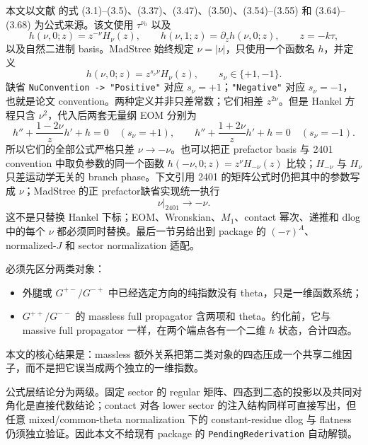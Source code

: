 \documentclass[11pt,a4paper]{ctexart}
\begin{document}
本文以文献 \cite{Chen:2023eic} 的式 (3.1)--(3.5)、(3.37)、(3.47)、(3.50)、(3.54)--(3.55) 和 (3.64)--(3.68) 为公式来源。该文使用 $\tau^{\nu_0}$ 以及
\begin{equation}
 h(\nu,0;z)=z^{-\nu}H_{\nu}(z),
 \qquad
 h(\nu,1;z)=\partial_z h(\nu,0;z),
 \qquad z=-k\tau,
 \label{eq:paper-h-definition}
\end{equation}
以及自然二进制 basis。MadStree 始终规定 $\nu=|\nu|$，只使用一个函数名 $h$，并定义
\begin{equation}
 \boxed{h(\nu,0;z)=z^{s_\nu\nu}H_\nu(z)},
 \qquad s_\nu\in\{+1,-1\}.
 \label{eq:positive-order-h}
\end{equation}
缺省 \texttt{NuConvention -> "Positive"} 对应 $s_\nu=+1$；\texttt{"Negative"} 对应 $s_\nu=-1$，也就是论文 convention。两种定义并非只差常数；它们相差 $z^{2\nu}$。但是 Hankel 方程只含 $\nu^2$，代入后两套无量纲 EOM 分别为
\begin{equation}
 h''+\frac{1-2\nu}{z}h'+h=0\quad(s_\nu=+1),
 \qquad
 h''+\frac{1+2\nu}{z}h'+h=0\quad(s_\nu=-1).
\end{equation}
所以它们的全部公式严格只差 $\nu\to-\nu$。也可以把正 prefactor basis 与 2401 convention 中取负参数的同一个函数 $h(-\nu,0;z)=z^\nu H_{-\nu}(z)$ 比较；$H_{-\nu}$ 与 $H_\nu$ 只差运动学无关的 branch phase。下文引用 2401 的矩阵公式时仍把其中的参数写成 $\nu$；MadStree 的正 prefactor缺省实现统一执行
\begin{equation}
 \boxed{\left.\nu\right|_{2401}\longrightarrow-\nu}.
 \label{eq:paper-to-positive-order}
\end{equation}
这不是只替换 Hankel 下标；EOM、Wronskian、$M_1$、contact 幂次、递推和 dlog 中的每个 $\nu$ 都必须同时替换。最后一节另给出到 package 的 $(-\tau)^A$、normalized-$J$ 和 sector normalization 适配。

必须先区分两类对象：
\begin{itemize}
  \item 外腿或 $G^{+-}/G^{-+}$ 中已经选定方向的纯指数没有 theta，只是一维函数系统；
  \item $G^{++}/G^{--}$ 的 massless full propagator 含两项和 theta。约化前，它与 massive full propagator 一样，在两个端点各有一个二维 $h$ 状态，合计四态。
\end{itemize}
本文的核心结果是：massless 额外关系把第二类对象的四态压成一个共享二维因子，而不是把它误当成两个独立的一维指数。

公式层结论分为两级。固定 sector 的 regular 矩阵、四态到二态的投影以及共同对角化是直接代数结论；contact 对各 lower sector 的注入结构同样可直接写出，但任意 mixed/common-theta normalization 下的 constant-residue dlog 与 flatness 仍须独立验证。因此本文不给现有 package 的 \texttt{PendingRederivation} 自动解锁。
\end{document}
